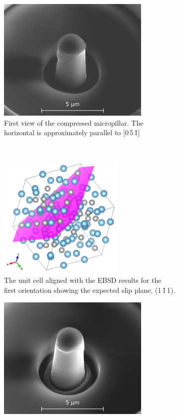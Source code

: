 \begin{figure}[!h]
\centering
\begin{subfigure}{0.45\textwidth}
\centering
\includegraphics[width=0.8\textwidth]{pillar_3_v1}
\caption{First view of the compressed  micropillar. The horizontal is approximately parallel to [0\,5\,\={1}]}
\end{subfigure}
~
\begin{subfigure}{0.45\textwidth}
\centering
\includegraphics[width=0.66\textwidth]{Pillar_3_unit_cell_v1}
\caption{The unit cell aligned with the EBSD results for the first orientation showing the expected slip plane, (1\,\={1}\,1).}
\end{subfigure}
\par\bigskip
\begin{subfigure}{0.45\textwidth}
\centering
\includegraphics[width=0.8\textwidth]{pillar_3_v2}

\end{subfigure}
\end{figure}
